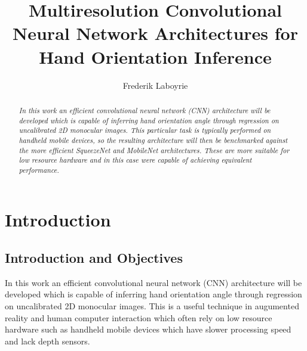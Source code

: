 \documentclass{article}
\begin{document}
\author{Frederik Laboyrie}
\title{Multiresolution Convolutional Neural Network Architectures for Hand Orientation Inference}
\maketitle
\begin{abstract}
\emph{In this work an efficient convolutional neural network (CNN) architecture will be developed which is capable of inferring hand orientation angle through regression on uncalibrated 2D monocular images. This particular task is typically performed on handheld mobile devices, so the resulting architecture will then be benchmarked against the more efficient SqueezeNet and MobileNet architectures. These are more suitable for low resource hardware and in this case were capable of achieving equivalent performance.}
\end{abstract}

\pagebreak

\tableofcontents

\pagebreak

\section{Introduction}
\subsection{Introduction and Objectives}

In this work an efficient convolutional neural network (CNN) architecture will be developed which is capable of inferring hand orientation angle through regression on uncalibrated 2D monocular images. This is a useful technique in augumented reality and human computer interaction which often rely on low resource hardware such as handheld mobile devices which have slower processing speed and lack depth sensors.\\
\end{document}
